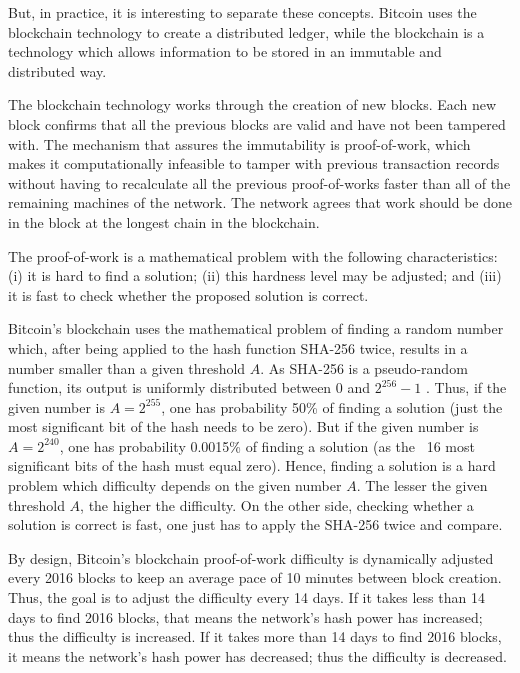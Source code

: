 But, in practice, it is interesting to separate these concepts. Bitcoin uses the blockchain technology to create a distributed ledger, while the blockchain is a technology which allows information to be stored in an immutable and distributed way.

The blockchain technology works through the creation of new blocks. Each new block confirms that all the previous blocks are valid and have not been tampered with. The mechanism that assures the immutability is proof-of-work, which makes it computationally infeasible to tamper with previous transaction records without having to recalculate all the previous proof-of-works faster than all of the remaining machines of the network. The network agrees that work should be done in the block at the longest chain in the blockchain.

The proof-of-work is a mathematical problem with the following characteristics: (i) it is hard to find a solution; (ii) this hardness level may be adjusted; and (iii) it is fast to check whether the proposed solution is correct.

Bitcoin's blockchain uses the mathematical problem of finding a random number which, after being applied to the hash function SHA-256 twice, results in a number smaller than a given threshold $A$. As SHA-256 is a pseudo-random function, its output is uniformly distributed between 0 and $2^{256}-1$ \citep{gilbert2003security}. Thus, if the given number is $A = 2^{255}$, one has probability 50\% of finding a solution (just the most significant bit of the hash needs to be zero). But if the given number is $A = 2^{240}$, one has probability 0.0015\% of finding a solution (as the ~16 most significant bits of the hash must equal zero). Hence, finding a solution is a hard problem which difficulty depends on the given number $A$. The lesser the given threshold $A$, the higher the difficulty. On the other side, checking whether a solution is correct is fast, one just has to apply the SHA-256 twice and compare.

By design, Bitcoin's blockchain proof-of-work difficulty is dynamically adjusted every 2016 blocks to keep an average pace of 10 minutes between block creation. Thus, the goal is to adjust the difficulty every 14 days. If it takes less than 14 days to find 2016 blocks, that means the network's hash power has increased; thus the difficulty is increased. If it takes more than 14 days to find 2016 blocks, it means the network's hash power has decreased; thus the difficulty is decreased.

